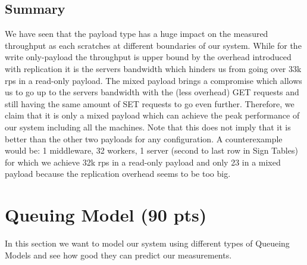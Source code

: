 \documentclass[11pt,a4paper]{article}
\begin{document}
\subsection{Summary}
We have seen that the payload type has a huge impact on the measured throughput as each scratches at different boundaries of our system. While for the write only-payload the throughput is upper bound by the overhead introduced with replication it is the servers bandwidth which hinders us from going over 33k rps in a read-only payload. The mixed payload brings a compromise which allows us to go up to the servers bandwidth with the (less overhead) GET requests and still having the same amount of SET requests to go even further. Therefore, we claim that it is only a mixed payload which can achieve the peak performance of our system including all the machines. Note that this does not imply that it is better than the other two payloads for any configuration. A counterexample would be: 1 middleware, 32 workers, 1 server (second to last row in Sign Tables) for which we achieve 32k rps in a read-only payload and only 23 in a mixed payload because the replication overhead seems to be too big. 

\section{Queuing Model (90 pts)}

In this section we want to model our system using different types of Queueing Models and see how good they can predict our measurements.
\end{document}
